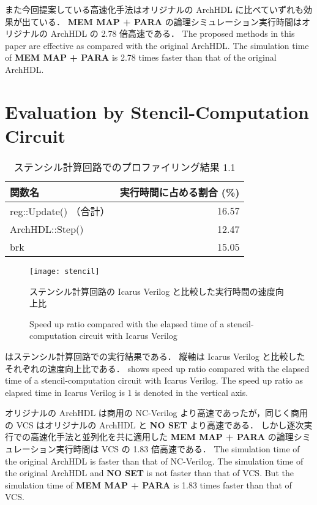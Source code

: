 また今回提案している高速化手法はオリジナルの ArchHDL に比べていずれも効果が出ている．
\textbf{MEM MAP + PARA} の論理シミュレーション実行時間はオリジナルの ArchHDL の 2.78 倍高速である．
\fi
The proposed methods in this paper are effective as compared with the original ArchHDL.
The simulation time of \textbf{MEM MAP + PARA} is 2.78 times faster than that of the original ArchHDL.


\section{Evaluation by Stencil-Computation Circuit}


\begin{table}[tb]
 \caption{ステンシル計算回路でのプロファイリング結果 1.1}
 \label{table:stencil_prof1.1}
 \begin{center}
  \begin{tabular}{lr} \toprule
  関数名 & 実行時間に占める割合 (\%) \\ \midrule
  reg::Update() （合計） & 16.57 \\
  ArchHDL::Step() & 12.47 \\
  brk & 15.05 \\ \bottomrule
  \end{tabular}
 \end{center}
\end{table}

\fi

\begin{figure}[tb]
 \centering
 \texttt{[image: stencil]}
 \caption{ステンシル計算回路の Icarus Verilog と比較した実行時間の速度向上比}
\fi
 \caption{Speed up ratio compared with the elapsed time of a stencil-computation circuit with Icarus Verilog}
 \label{fig:stencil}
\end{figure}

 はステンシル計算回路での実行結果である．
縦軸は Icarus Verilog と比較したそれぞれの速度向上比である．
\fi
{} shows speed up ratio compared with the elapsed time of a stencil-computation circuit with Icarus Verilog.
The speed up ratio as elapsed time in Icarus Verilog is 1 is denoted in the vertical axis.

オリジナルの ArchHDL は商用の NC-Verilog より高速であったが，同じく商用の VCS はオリジナルの ArchHDL と \textbf{NO SET} より高速である．
しかし逐次実行での高速化手法と並列化を共に適用した \textbf{MEM MAP + PARA} の論理シミュレーション実行時間は VCS の 1.83 倍高速である．
\fi
The simulation time of the original ArchHDL is faster than that of NC-Verilog.
The simulation time of the original ArchHDL and \textbf{NO SET} is not faster than that of VCS.
But the simulation time of \textbf{MEM MAP + PARA} is 1.83 times faster than that of VCS.

